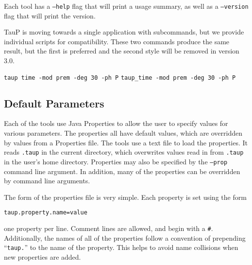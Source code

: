 Each tool has a \texttt{--help} flag that will print a usage summary, as well
as a \texttt{--version} flag that will print the version.

TauP is moving towards a single application with subcommands,
but we provide individual scripts for compatibility. These
two commands produce the same result, but the first is
preferred and the second style will be removed in version 3.0.

\texttt{taup time -mod prem -deg 30 -ph P}
\texttt{taup\_time -mod prem -deg 30 -ph P}

\subsection{Default Parameters} \label{properties}

Each of the tools use Java Properties to allow the user to specify values
for various
parameters. The properties all have default values, which are overridden by
values from a Properties file. The tools use a text file to load the properties. It reads  \texttt{.taup} in the
current directory, which overwrites values read in from
\texttt{.taup} in the user's home directory. Properties may also be specified by
the \texttt{--prop} command line argument.
In addition, many of the properties can be overridden by command line arguments.

The form of the properties file is very simple. Each property is set using
the form
\begin{verbatim}
taup.property.name=value
\end{verbatim}
 one property per line.
Comment lines are allowed, and begin with a \texttt{\#}.
Additionally, the names of all of the properties follow a convention of
prepending ``\texttt{taup.}'' to the name of the property.
This helps to avoid name collisions when new properties
are added.

